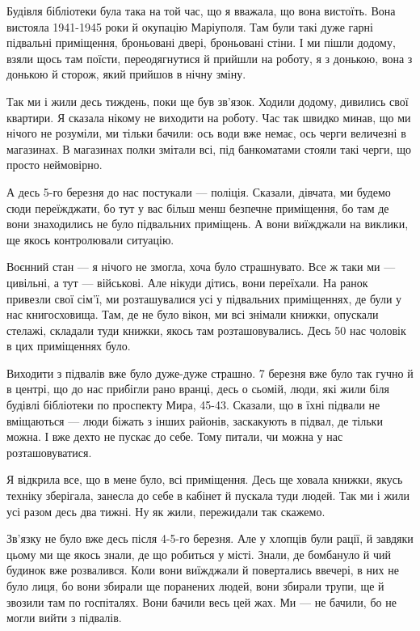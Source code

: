 Будівля бібліотеки була така на той час, що я вважала, що вона вистоїть. Вона
вистояла 1941-1945 роки й окупацію Маріуполя. Там були такі дуже гарні
підвальні приміщення, броньовані двері, броньовані стіни. І ми пішли додому,
взяли щось там поїсти, переодягнутися й прийшли на роботу, я з донькою, вона з
донькою й сторож, який прийшов в нічну зміну.

Так ми і жили десь тиждень, поки ще був зв'язок. Ходили додому, дивились свої
квартири. Я сказала нікому не виходити на роботу. Час так швидко минав, що ми
нічого не розуміли, ми тільки бачили: ось води вже немає, ось черги величезні в
магазинах. В магазинах полки змітали всі, під банкоматами стояли такі черги, що
просто неймовірно. 


А десь 5-го березня до нас постукали — поліція. Сказали, дівчата, ми будемо
сюди переїжджати, бо тут у вас більш менш безпечне приміщення, бо там де вони
знаходились не було підвальних приміщень. А вони виїжджали на виклики, ще якось
контролювали ситуацію.

Воєнний стан — я нічого не змогла, хоча було страшнувато. Все ж таки ми —
цивільні, а тут — військові. Але нікуди дітись, вони переїхали. На ранок
привезли свої сім'ї, ми розташувалися усі у підвальних приміщеннях, де були у
нас книгосховища. Там, де не було вікон, ми всі знімали книжки, опускали
стелажі, складали туди книжки, якось там розташовувались. Десь 50 нас чоловік в
цих приміщеннях було.

Виходити з підвалів вже було дуже-дуже страшно. 7 березня вже було так гучно й
в центрі, що до нас прибігли рано вранці, десь о сьомій, люди, які жили біля
будівлі бібліотеки по проспекту Мира, 45-43. Сказали, що в їхні підвали не
вміщаються — люди біжать з інших районів, заскакують в підвал, де тільки можна.
І вже дехто не пускає до себе. Тому питали, чи можна у нас розташовуватися.

Я відкрила все, що в мене було, всі приміщення. Десь ще ховала книжки, якусь
техніку зберігала, занесла до себе в кабінет й пускала туди людей. Так ми і
жили усі разом десь два тижні. Ну як жили, пережидали так скажемо.

Зв'язку не було вже десь після 4-5-го березня. Але у хлопців були рації, й
завдяки цьому ми ще якось знали, де що робиться у місті. Знали, де бомбануло й
чий будинок вже розвалився. Коли вони виїжджали й повертались ввечері, в них не
було лиця, бо вони збирали ще поранених людей, вони збирали трупи, ще й звозили
там по госпіталях. Вони бачили весь цей жах. Ми — не бачили, бо не могли вийти
з підвалів.

